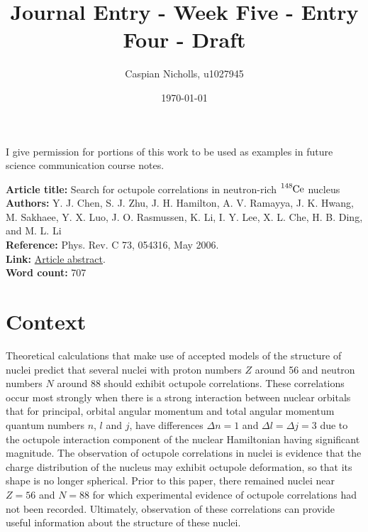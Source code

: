 \documentclass[12pt,a4paper]{article}
\begin{document}
\title{Journal Entry - Week Five - Entry Four - Draft}
\author{Caspian Nicholls, u1027945}
\date{\today}

\maketitle

\noindent
I give permission for portions of this work to be used as examples in future science communication course notes.

\medskip
\noindent
\textbf{Article title:} Search for octupole correlations in neutron-rich $\ce{^{148}Ce}$ nucleus \\
\textbf{Authors:} Y. J. Chen, S. J. Zhu, J. H. Hamilton, A. V. Ramayya, J. K. Hwang, M. Sakhaee, Y. X. Luo, J. O. Rasmussen, K. Li, I. Y. Lee, X. L. Che, H. B. Ding, and M. L. Li \\
\textbf{Reference:} Phys. Rev. C 73, 054316, May 2006. \\
\textbf{Link:}  \href{10.1103/PhysRevC.73.054316}{Article abstract}. \\
\textbf{Word count:} 707

\section*{Context}
Theoretical calculations that make use of accepted models of the structure of nuclei predict that several nuclei with proton numbers $Z$ around 56 and neutron numbers $N$ around 88 should exhibit octupole correlations. These correlations occur most strongly when there is a strong interaction between nuclear orbitals that for principal, orbital angular momentum and total angular momentum quantum numbers $n$, $l$ and $j$, have differences $\Delta n = 1$ and $\Delta l = \Delta j = 3$ due to the octupole interaction component of the nuclear Hamiltonian having significant magnitude. The observation of octupole correlations in nuclei is evidence that the charge distribution of the nucleus may exhibit octupole deformation, so that its shape is no longer spherical. Prior to this paper, there remained nuclei near $Z = 56$ and $N = 88$ for which experimental evidence of octupole correlations had not been recorded. Ultimately, observation of these correlations can provide useful information about the structure of these nuclei.
\end{document}
